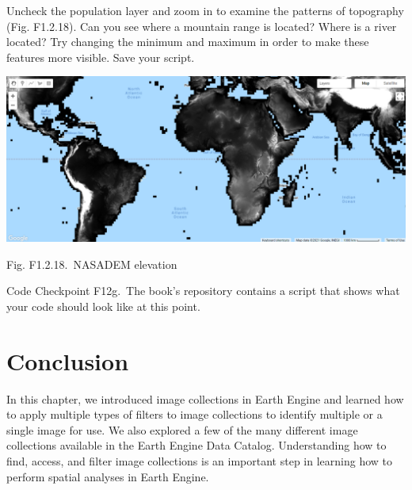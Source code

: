 \documentclass[
  letterpaper,
  DIV=11,
  numbers=noendperiod]{scrreprt}
\begin{document}
Uncheck the population layer and zoom in to examine the patterns of
topography (Fig. F1.2.18). Can you see where a mountain range is
located? Where is a river located? Try changing the minimum and maximum
in order to make these features more visible. Save your script.

\includegraphics{./F1/image61.png}

Fig. F1.2.18.~NASADEM elevation

\begin{tcolorbox}[enhanced jigsaw, left=2mm, breakable, rightrule=.15mm, opacityback=0, colframe=quarto-callout-note-color-frame, colbacktitle=quarto-callout-note-color!10!white, arc=.35mm, opacitybacktitle=0.6, toptitle=1mm, colback=white, leftrule=.75mm, title=\textcolor{quarto-callout-note-color}{\faInfo}\hspace{0.5em}{Note}, toprule=.15mm, bottomtitle=1mm, titlerule=0mm, bottomrule=.15mm, coltitle=black]

Code Checkpoint F12g.~The book's repository contains a script that shows
what your code should look like at this point.

\end{tcolorbox}

\hypertarget{conclusion-2}{%
\section*{Conclusion}\label{conclusion-2}}


In this chapter, we introduced image collections in Earth Engine and
learned how to apply multiple types of filters to image collections to
identify multiple or a single image for use. We also explored a few of
the many different image collections available in the Earth Engine Data
Catalog. Understanding how to find, access, and filter image collections
is an important step in learning how to perform spatial analyses in
Earth Engine.
\end{document}
